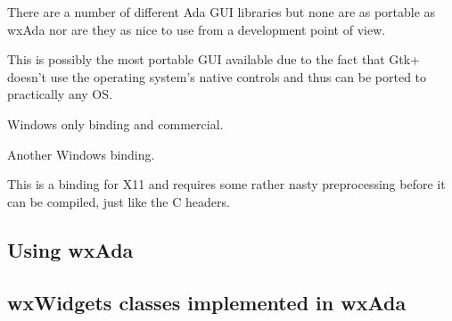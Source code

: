 There are a number of different Ada GUI libraries but none are as portable as wxAda nor are they as nice to use from a development point of view.


This is possibly the most portable GUI available due to the fact that Gtk+ doesn't use the operating system's native controls and thus
can be ported to practically any OS.


Windows only binding and commercial.


Another Windows binding.


This is a binding for X11 and requires some rather nasty preprocessing before it can be compiled, just like the C headers.

\subsection{Using wxAda}\label{usingwxada}
\subsection{wxWidgets classes implemented in wxAda}\label{wxwidgetsclassesimplementedinwxada}

